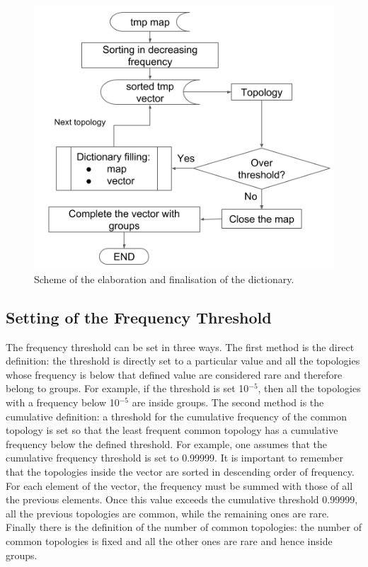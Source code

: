 %
\begin{figure}
  \centering
  \includegraphics[scale=0.6]{figures/build.png}
  \caption{Scheme of the elaboration and finalisation of the dictionary.}
  \label{fig:build}
\end{figure}
%
\subsection{Setting of the Frequency Threshold}
The frequency threshold can be set in three ways. The first method is the direct definition: the threshold is directly set to a particular value and all the topologies whose frequency is below that defined value are considered rare and therefore belong to groups. For example, if the threshold is set 10$^{-5}$, then all the topologies with a frequency below 10$^{-5}$ are inside groups. The second method is the cumulative definition: a threshold for the cumulative frequency of the common topology is set so that the least frequent common topology has a cumulative frequency below the defined threshold. For example, one assumes that the cumulative frequency threshold is set to 0.99999. It is important to remember that the topologies inside the vector are sorted in descending order of frequency. For each element of the vector, the frequency must be summed with those of all the previous elements. Once this value exceeds the cumulative threshold 0.99999, all the previous topologies are common, while the remaining ones are rare. Finally there is the definition of the number of common topologies: the number of common topologies is fixed and all the other ones are rare and hence inside groups.
